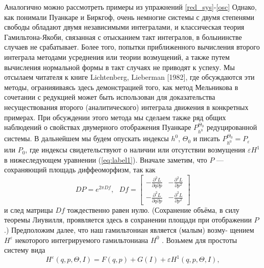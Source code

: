 \documentclass[twoside, a4paper]{article}
\begin{document}
Аналогично можно рассмотреть примеры из упражнений \ref{red_sys}-\ref{osc} Однако, как понимали Пуанкаре и Биркгоф, очень немногие системы с двумя степенями свободы обладают двумя независимыми интегралами, и классическая теория Гамильтона-Якоби, связанная с отысканием такт интегралов, в болыиинстве случаев не срабатывает. Более того, попытки приближенного вычисления второго интеграла методами усреднения или теории возмущений, а также путем вычисления нормальной формы в такт случаях не приводят к успеху. Мы отсылаем читателя к книге Lichtenberg, Lieberman [1982], где обсуждаются эти методы, огранияиваясь здесь демонстрацией того, как метод Мельникова в сочетании с редукцией может быть использован для доказательства несуществования второго (аналитического) интеграла движения в конкретных примерах. При обсуждении этого метода мы сделаем также ряд общих наблюдений о свойствах двумерного отображения Пуанкаре $P_{h^0}^{\Theta_0}$ редуцированной системы. В дальнейшем мы будем опускать индексы $h^0$, $\Theta_0$ и  писать $P_{h^0}^{\Theta_0}=P_\varepsilon$ или $P_0$, где индексы свидетельствуют о наличии или отсутствии возмущения $\varepsilon H^1$ в нижеследующем уравнении (\ref{eq:label1}).
Вначале заметим, что $P$ --- сохраняющий площадь диффеоморфизм, так
как
\begin{equation}
DP=e^{2\pi Df} , \text{~~}  Df=
\left[\begin{array}{cc}
-\frac{\partial^2L}{\partial q\partial p} & -\frac{\partial^2L}{\partial p^2} \\
-\frac{\partial^2L}{\partial q\partial p} & -\frac{\partial^2L}{\partial p^2}
\end{array}\right]
\end{equation}
и след матрицы $Df$ тождественно равен нулю. (Сохранение объёма, в силу теоремы Лиувилля, проявляется здесь в сохранении площади при отображении $P$.)
Предположим далее, что наш гамильтониан является (малым) возму- щением $H^\varepsilon$ некоторого интегрируемого гамильтониана $H^0$ . Возьмем для простоты систему вида
\begin{equation}
H^\varepsilon (q,p,\Theta,I) = F(q,p)+G(I)+\varepsilon H^1(q,p,\Theta, I),
\label{eq:label1}
\end{equation}
\end{document}
